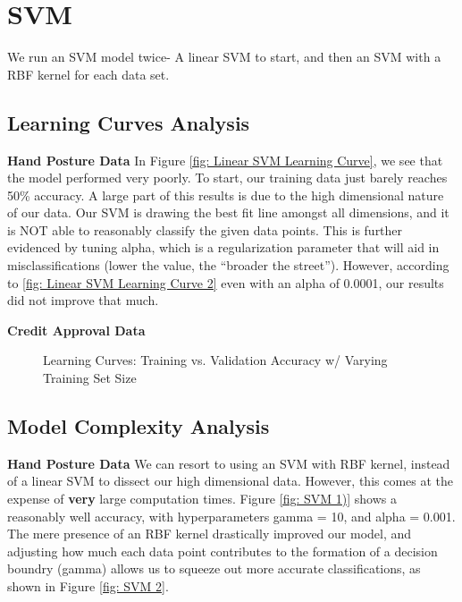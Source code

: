 \documentclass[letterpaper,12pt]{article}
\begin{document}
\section{SVM}
We run an SVM model twice- A linear SVM to start, and then an SVM with a RBF kernel for each data set.

\subsection{Learning Curves Analysis}

\textbf{Hand Posture Data}
In Figure \ref{fig: Linear SVM Learning Curve}, we see that the model performed very poorly.  To start, our training data just barely reaches 50\% accuracy.  A large part of this results is due to the high dimensional nature of our data.  Our SVM is drawing the best fit line amongst all dimensions, and it is NOT able to reasonably classify the given data points.  This is further evidenced by tuning alpha, which is a regularization parameter that will aid in misclassifications (lower the value, the ``broader the street'').  However, according to \ref{fig: Linear SVM Learning Curve 2} even with an alpha of 0.0001, our results did not improve that much.  

\textbf{Credit Approval Data}

\begin{figure} %
  
  \centering
  \hspace{8pt}%
  \caption{Learning Curves:  Training vs. Validation Accuracy w/ Varying Training Set Size}\label{fig:SVM Learning Curves}
\end{figure}

\subsection{Model Complexity Analysis}
\textbf{Hand Posture Data}  We can resort to using an SVM with RBF kernel, instead of a linear SVM to dissect our high dimensional data.  However, this comes at the expense of \textbf{very} large computation times.  Figure \ref{fig: SVM 1)} shows a reasonably well accuracy, with hyperparameters gamma = 10, and alpha = 0.001.  The mere presence of an RBF kernel drastically improved our model, and adjusting how much each data point contributes to the formation of a decision boundry (gamma) allows us to squeeze out more accurate classifications, as shown in Figure \ref{fig: SVM 2}.  
\end{document}
